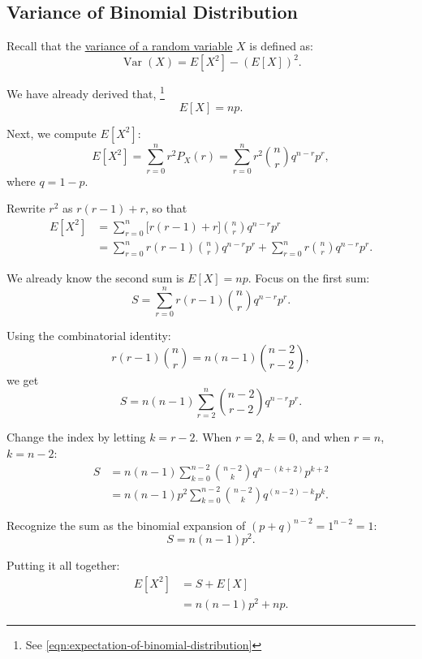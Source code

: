 \subsection{Variance of Binomial Distribution}
\label{ssec:variance-of-binomial-distribution}

Recall that the
\hyperref[sec:variance-of-a-random-variable]{variance of a
random variable} \(X\) is defined as:
\[
  \operatorname{Var}(X) = E[X^2] - (E[X])^2.
\]

We have already derived that,
\footnote{See \autoref{eqn:expectation-of-binomial-distribution}}
\[
  E[X] = n p.
\]

\bigskip

Next, we compute \(E[X^2]\):
\[
  E[X^2] = \sum_{r=0}^n r^2 P_X(r) = \sum_{r=0}^n r^2 \binom{n}{r} q^{n-r} p^r,
\]
where \(q = 1-p\).

\bigskip

Rewrite \(r^2\) as \(r(r-1) + r\), so that
\begin{align*}
  E[X^2] 
&= \sum_{r=0}^n \bigl[r(r-1) + r\bigr] \binom{n}{r} q^{n-r} p^r \\
&= \sum_{r=0}^n r(r-1) \binom{n}{r} q^{n-r} p^r + \sum_{r=0}^n r \binom{n}{r} q^{n-r} p^r.
\end{align*}

\bigskip

We already know the second sum is \(E[X] = n p\). Focus on the first sum:
\[
  S = \sum_{r=0}^n r(r-1) \binom{n}{r} q^{n-r} p^r.
\]

\bigskip

Using the combinatorial identity:
\[
  r(r-1) \binom{n}{r} = n (n-1) \binom{n-2}{r-2},
\]
we get
\[
  S = n (n-1) \sum_{r=2}^n \binom{n-2}{r-2} q^{n-r} p^r.
\]

\bigskip

Change the index by letting \(k = r - 2\). When \(r=2\), \(k=0\), and when \(r=n\), \(k = n-2\):
\begin{align*}
  S 
&= n (n-1) \sum_{k=0}^{n-2} \binom{n-2}{k} q^{n - (k+2)} p^{k+2} \\
&= n (n-1) p^2 \sum_{k=0}^{n-2} \binom{n-2}{k} q^{(n-2)-k} p^k.
\end{align*}

\bigskip

Recognize the sum as the binomial expansion of \((p + q)^{n-2} = 1^{n-2} = 1\):
\[
  S = n (n-1) p^2.
\]

\bigskip

Putting it all together:
\begin{align*}
  E[X^2] &= S + E[X] \\
         &= n (n-1) p^2 + n p.
\end{align*}

